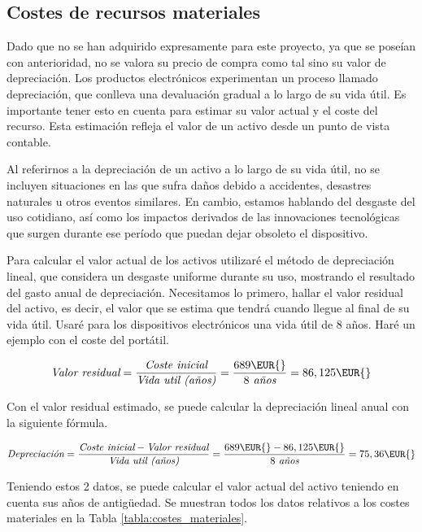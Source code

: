 \subsection{Costes de recursos materiales}

Dado que no se han adquirido expresamente para este proyecto, ya que se poseían con anterioridad, no se valora su precio de compra como tal sino su valor de depreciación. Los productos electrónicos experimentan un proceso llamado depreciación, que conlleva una devaluación gradual a lo largo de su vida útil. Es importante tener esto en cuenta para estimar su valor actual y el coste del recurso. Esta estimación refleja el valor de un activo desde un punto de vista contable.

Al referirnos a la depreciación de un activo a lo largo de su vida útil, no se incluyen situaciones en las que sufra daños debido a accidentes, desastres naturales u otros eventos similares. En cambio, estamos hablando del desgaste del uso cotidiano, así como los impactos derivados de las innovaciones tecnológicas que surgen durante ese período que puedan dejar obsoleto el dispositivo.

Para calcular el valor actual de los activos utilizaré el método de depreciación lineal, que considera un desgaste uniforme durante su uso, mostrando el resultado del gasto anual de depreciación\cite{depreciacion_pcs}. Necesitamos lo primero, hallar el valor residual del activo, es decir, el valor que se estima que tendrá cuando llegue al final de su vida útil. Usaré para los dispositivos electrónicos una vida útil de 8 años. Haré un ejemplo con el coste del portátil.

\begin{equation*}
    \textit{Valor residual} = {\frac{\textit{Coste inicial}}{\textit{Vida util (años)}}} = \frac{689 \EUR{}} {8 \textit{ años}} = 86,125 \EUR{}
\end{equation*}

Con el valor residual estimado, se puede calcular la depreciación lineal anual con la siguiente fórmula.

\begin{equation*}
    \textit{Depreciación} = {\frac{\textit{Coste inicial} - \textit{Valor residual}}{\textit{Vida util (años)}}} = \frac{689\EUR{}-86,125\EUR{}} {8 \textit{ años}} = 75,36 \EUR{}
\end{equation*}

Teniendo estos 2 datos, se puede calcular el valor actual del activo teniendo en cuenta sus años de antigüedad. Se muestran todos los datos relativos a los costes materiales en la Tabla \ref{tabla:costes_materiales}.


